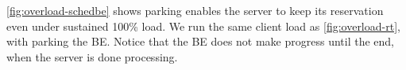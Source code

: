 \autoref{fig:overload-schedbe} shows parking enables the server to keep its
reservation even under sustained 100\% load. We run the same client load as
\autoref{fig:overload-rt}, with \beclass{} parking the BE. Notice that the BE
does not make progress until the end, when the server is done processing.
